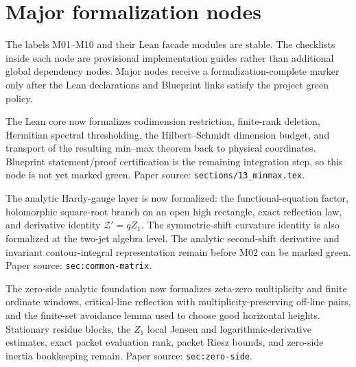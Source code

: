 \section{Major formalization nodes}

The labels M01--M10 and their Lean facade modules are stable.  The checklists
inside each node are provisional implementation guides rather than additional
global dependency nodes.  Major nodes receive a formalization-complete marker
only after the Lean declarations and Blueprint links satisfy the project green
policy.

\begin{definition}
\label{node:m01}
\notready
{}
The Lean core now formalizes codimension restriction, finite-rank deletion,
Hermitian spectral thresholding, the Hilbert--Schmidt dimension budget, and
transport of the resulting min--max theorem back to physical coordinates.
Blueprint statement/proof certification is the remaining integration step, so
this node is not yet marked green.  Paper source:
\texttt{sections/13\_minmax.tex}.
\end{definition}

\begin{definition}
\label{node:m02}
\notready
{}
The analytic Hardy-gauge layer is now formalized: the functional-equation
factor, holomorphic square-root branch on an open high rectangle, exact
reflection law, and derivative identity $\mathscr Z'=qZ_1$.  The symmetric-shift
curvature identity is also formalized at the two-jet algebra level.  The
analytic second-shift derivative and invariant contour-integral representation
remain before M02 can be marked green.  Paper source: \texttt{sec:common-matrix}.
\end{definition}

\begin{definition}
\label{node:m03}
\notready
{}
The zero-side analytic foundation now formalizes zeta-zero multiplicity and
finite ordinate windows, critical-line reflection with multiplicity-preserving
off-line pairs, and the finite-set avoidance lemma used to choose good
horizontal heights.  Stationary residue blocks, the $Z_1$ local Jensen and
logarithmic-derivative estimates, exact packet evaluation rank, packet Riesz
bounds, and zero-side inertia bookkeeping remain.  Paper source:
\texttt{sec:zero-side}.
\end{definition}

